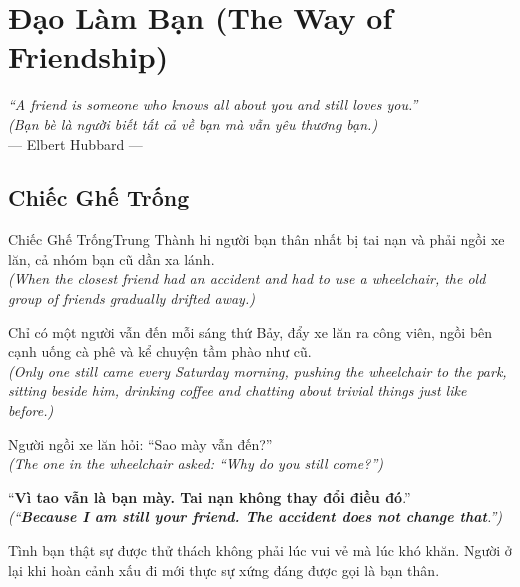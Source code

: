 \chapter{Đạo Làm Bạn (The Way of Friendship)}

\begin{center}
  \textit{\color{truyenblue}``A friend is someone who knows all about you and still loves you.''}\\
  \textit{(Bạn bè là người biết tất cả về bạn mà vẫn yêu thương bạn.)}\\[4pt]
  \small\color{truyengold}--- Elbert Hubbard ---
\end{center}
\ngancach

\section{Chiếc Ghế Trống}
\begin{truyen}{Chiếc Ghế Trống}{Trung Thành}
hi người bạn thân nhất bị tai nạn và phải ngồi xe lăn, cả nhóm bạn cũ dần xa lánh.\\
\textit{(When the closest friend had an accident and had to use a wheelchair, the old group of friends gradually drifted away.)}

Chỉ có một người vẫn đến mỗi sáng thứ Bảy, đẩy xe lăn ra công viên, ngồi bên cạnh uống cà phê và kể chuyện tầm phào như cũ.\\
\textit{(Only one still came every Saturday morning, pushing the wheelchair to the park, sitting beside him, drinking coffee and chatting about trivial things just like before.)}

Người ngồi xe lăn hỏi: ``Sao mày vẫn đến?''\\
\textit{(The one in the wheelchair asked: ``Why do you still come?'')}

``\textbf{Vì tao vẫn là bạn mày. Tai nạn không thay đổi điều đó}.''\\
\textit{(``\textbf{Because I am still your friend. The accident does not change that}.'')}
\end{truyen}
\begin{baihoc}
  Tình bạn thật sự được thử thách không phải lúc vui vẻ mà lúc khó khăn. Người ở lại khi hoàn cảnh xấu đi mới thực sự xứng đáng được gọi là bạn thân.
\end{baihoc}

